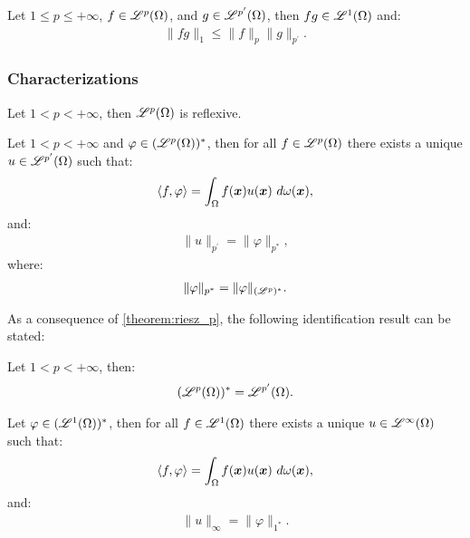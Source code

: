 \begin{theorem}
    Let $1 \leq p \leq +\infty$, $f \in \mathscr{L}^{p}(\Omega)$, and $g \in \mathscr{L}^{p^{\prime}}(\Omega)$, then $fg \in \mathscr{L}^{1}(\Omega)$ and:
    \begin{gather}
        \lVert fg \rVert_1 \leq \lVert f \rVert_p \lVert g \rVert_{p^{\prime}}.
    \end{gather}
\end{theorem}

\subsubsection{Characterizations}

\begin{theorem}
    Let $1 < p < +\infty$, then $\mathscr{L}^{p}(\Omega)$ is reflexive.
\end{theorem}

\begin{theorem} \label{theorem:riesz_p}
    Let $1 < p < +\infty$ and $\varphi \in (\mathscr{L}^{p}(\Omega))^*$, then for all $f \in \mathscr{L}^{p}(\Omega)$ there exists a unique $u \in \mathscr{L}^{p^{\prime}}(\Omega)$ such that:
    \begin{gather}
        \langle f, \varphi \rangle = \int_{\Omega} f(\bm{x}) u(\bm{x}) ~ d \omega(\bm{x}),
    \end{gather}
    and:
    \begin{gather}
        \lVert u \rVert_{p^{\prime}} = \lVert \varphi \rVert_{p^*},
    \end{gather}
    where:
    \begin{gather}
        \lVert \varphi \rVert_{p^*} = \lVert \varphi \rVert_{(\mathscr{L}^{p})^*}.
    \end{gather}
\end{theorem}

As a consequence of \cref{theorem:riesz_p}, the following identification result can be stated:

\begin{theorem}
    Let $1 < p < +\infty$, then:
    \begin{gather}
        (\mathscr{L}^{p}(\Omega))^* = \mathscr{L}^{p^{\prime}}(\Omega).
    \end{gather}
\end{theorem}

\begin{theorem}[Riesz representation theorem for $p = 1$] \label{theorem:riesz_1}
    Let $\varphi \in (\mathscr{L}^{1}(\Omega))^*$, then for all $f \in \mathscr{L}^{1}(\Omega)$ there exists a unique $u \in \mathscr{L}^{\infty}(\Omega)$ such that:
    \begin{gather}
        \langle f, \varphi \rangle = \int_{\Omega} f(\bm{x}) u(\bm{x}) ~ d \omega(\bm{x}),
    \end{gather}
    and:
    \begin{gather}
        \lVert u \rVert_{\infty} = \lVert \varphi \rVert_{1^*}.
    \end{gather}
\end{theorem}

